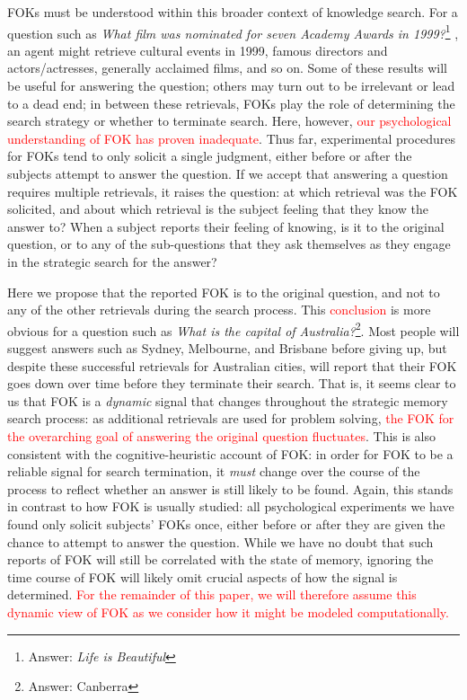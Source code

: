 \documentclass[10pt,letterpaper]{article}
\newcommand{\fixme}[2][]{#2}
\renewcommand{\fixme}[2][]{\textcolor{red}{#2}}
\newcommand{\question}[2]{\textit{#1}\footnote{Answer: #2}}
\begin{document}
FOKs must be understood within this broader context of knowledge search.
For a question such as \question{What film was nominated for seven Academy Awards in 1999?}{\textit{Life is Beautiful}} \cite{Norman2016TheRelationshipBetween}, an agent might retrieve cultural events in 1999, famous directors and actors/actresses, generally acclaimed films, and so on.
Some of these results will be useful for answering the question; others may turn out to be irrelevant or lead to a dead end; in between these retrievals, FOKs play the role of determining the search strategy or whether to terminate search.
Here, however, \fixme{our psychological understanding of FOK has proven inadequate}.
Thus far, experimental procedures for FOKs tend to only solicit a single judgment, either before or after the subjects attempt to answer the question.
If we accept that answering a question requires multiple retrievals, it raises the question: at which retrieval was the FOK solicited, and about which retrieval is the subject feeling that they know the answer to?
When a subject reports their feeling of knowing, is it to the original question, or to any of the sub-questions that they ask themselves as they engage in the strategic search for the answer?

Here we propose that the reported FOK is to the original question, and not to any of the other retrievals during the search process.
This \fixme{conclusion} is more obvious for a question such as \question{What is the capital of Australia?}{Canberra}.
Most people will suggest answers such as Sydney, Melbourne, and Brisbane before giving up, but despite these successful retrievals for Australian cities, will report that their FOK goes down over time before they terminate their search.
That is, it seems clear to us that FOK is a \textit{dynamic} signal that changes throughout the strategic memory search process: as additional retrievals are used for problem solving, \fixme[wording]{the FOK for the overarching goal of answering the original question fluctuates}.
This is also consistent with the cognitive-heuristic account of FOK: in order for FOK to be a reliable signal for search termination, it \textit{must} change over the course of the process to reflect whether an answer is still likely to be found.
Again, this stands in contrast to how FOK is usually studied: all psychological experiments we have found only solicit subjects' FOKs once, either before or after they are given the chance to attempt to answer the question. %
While we have no doubt that such reports of FOK will still be correlated with the state of memory, ignoring the time course of FOK will likely omit crucial aspects of how the signal is determined.
\fixme{For the remainder of this paper, we will therefore assume this dynamic view of FOK as we consider how it might be modeled computationally.}
\end{document}
